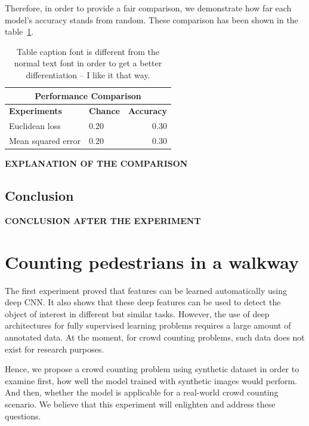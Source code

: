 \indent Therefore, in order to provide a fair comparison, we demonstrate how far each model's accuracy stands from random. These comparison has been shown in the table~\ref{tab:comp}.

\begin{table}[H]
\centering
\small\sffamily
\begin{tabular}{llr}
\multicolumn{3}{c}{\textbf{\textbf{Performance Comparison}}} \\
\bottomrule
\textbf{Experiments}  & \textbf{Chance} & \textbf{Accuracy} \\
\bottomrule
Euclidean loss           & 0.20 & 0.30 \\
Mean squared error       & 0.20 & 0.30 \\

\bottomrule
\end{tabular}
\caption{Table caption font is different from the normal text font in order to get a better differentiation -- I like it that way.}
\label{tab:comp}
\end{table} 

\textbf{EXPLANATION OF THE COMPARISON}

\subsection{Conclusion}

\textbf{CONCLUSION AFTER THE EXPERIMENT} 

\section{Counting pedestrians in a walkway}

The first experiment proved that features can be learned automatically using deep CNN. It also shows that these deep features can be used to detect the object of interest in different but similar tasks. However, the use of deep architectures for fully supervised learning problems requires a large amount of annotated data. At the moment, for crowd counting problems, such data does not exist for research purposes. 

Hence, we propose a crowd counting problem using synthetic dataset in order to examine first, how well the model trained with synthetic images would perform. And then, whether the model is applicable for a real-world crowd counting scenario. We believe that this experiment will enlighten and address these questions. 

